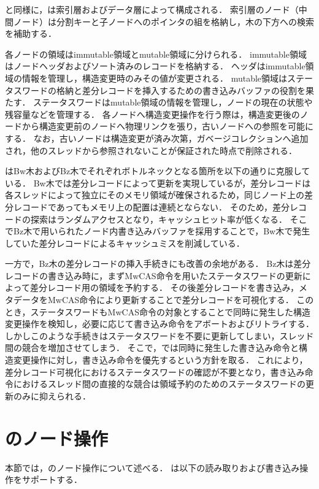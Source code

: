 \Bptree{}と同様に，\Bctree{}は索引層およびデータ層によって構成される．
索引層のノード（中間ノード）は分割キーと子ノードへのポインタの組を格納し，木の下方への検索を補助する．

各ノードの領域はimmutable領域とmutable領域に分けられる．
immutable領域はノードヘッダおよびソート済みのレコードを格納する．
ヘッダはimmutable領域の情報を管理し，構造変更時のみその値が変更される．
mutable領域はステータスワードの格納と差分レコードを挿入するための書き込みバッファの役割を果たす．
ステータスワードはmutable領域の情報を管理し，ノードの現在の状態や残容量などを管理する．
各ノードへ構造変更操作を行う際は，構造変更後のノードから構造変更前のノードへ物理リンクを張り，古いノードへの参照を可能にする．
なお，古いノードは構造変更が済み次第，ガベージコレクションへ追加され，他のスレッドから参照されないことが保証された時点で削除される．

\Bctree{}はBw木およびBz木でそれぞれボトルネックとなる箇所を以下の通りに克服している．
Bw木では差分レコードによって更新を実現しているが，差分レコードは各スレッドによって独立にそのメモリ領域が確保されるため，同じノード上の差分レコードであってもメモリ上の配置は連続とならない．
そのため，差分レコードの探索はランダムアクセスとなり，キャッシュヒット率が低くなる．
そこでBz木で用いられたノード内書き込みバッファを採用することで，Bw木で発生していた差分レコードによるキャッシュミスを削減している．

一方で，Bz木の差分レコードの挿入手続きにも改善の余地がある．
Bz木は差分レコードの書き込み時に，まずMwCAS命令を用いたステータスワードの更新によって差分レコード用の領域を予約する．
その後差分レコードを書き込み，メタデータをMwCAS命令により更新することで差分レコードを可視化する．
このとき，ステータスワードもMwCAS命令の対象とすることで同時に発生した構造変更操作を検知し，必要に応じて書き込み命令をアボートおよびリトライする．
しかしこのような手続きはステータスワードを不要に更新してしまい，スレッド間の競合を増加させてしまう．
そこで，\Bctree{}では同時に発生した書き込み命令と構造変更操作に対し，書き込み命令を優先するという方針を取る．
これにより，差分レコード可視化におけるステータスワードの確認が不要となり，書き込み命令におけるスレッド間の直接的な競合は領域予約のためのステータスワードの更新のみに抑えられる．

\section{\Bctree{}のノード操作}
\label{sec:node_operation}

本節では，\Bctree{}のノード操作について述べる．
\Bctree{}は以下の読み取りおよび書き込み操作をサポートする．

